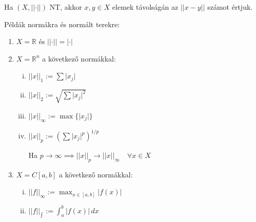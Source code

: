 \begin{definition}
    Ha $(X, \lvert \lvert \cdot \rvert \rvert)$ NT, akkor $x, y \in X$ elemek távolságán az $\lvert \lvert x-y \rvert \rvert$ számot értjuk.
\end{definition}


\begin{pelda}
    Példák normákra és normált terekre:
\begin{enumerate}
    \item $X = \mathbb{R}$ és $\lvert \lvert \cdot \rvert \rvert = \lvert \cdot \rvert$ 
    
    \item $X = \mathbb{R}^{n}$ a következő normákkal:
    \begin{enumerate}[(i)]
        \item $\lvert \lvert x \rvert\rvert_{1} :=   \sum \lvert x_{j} \rvert$
        \item $\lvert \lvert x \rvert \rvert_{2} := \sqrt{ \sum \lvert x_{j} \rvert^{2} }$
        \item $\lvert \lvert x \rvert \rvert_{\infty} := \max \{ \lvert x_{j} \rvert \}$
        \item $\lvert \lvert x \rvert \rvert_{p} := \left( \sum \lvert x_{j} \rvert^{p} \right)^{1 / p}$
        
        Ha $p \to \infty \implies \lvert \lvert x \rvert \rvert_{p} \to \lvert \lvert x \rvert \rvert_{\infty} \quad \forall x \in X$
    \end{enumerate}

    \item $X = C[a, b]$ a következő normákkal:
    \begin{enumerate}[(i)]
        \item $\lvert \lvert f \rvert \rvert_{\infty} := \max_{x \in[a, b]} \lvert f(x) \rvert$ 
	\item $\lvert \lvert f \rvert \rvert_{\int} := \int _{a}^{b} \lvert f(x) \rvert \, dx$
    \end{enumerate}
		
\end{enumerate}
\end{pelda}

